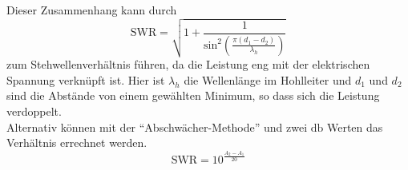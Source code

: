 Dieser Zusammenhang kann durch 
\begin{equation}
    \label{eqn:SWR}
    \text{SWR} =\sqrt{1 + \frac{1}{ \text{sin}^2 \left( \frac{\pi (d_1 - d_2)}{\lambda_h}  \right)} } 
\end{equation}
zum Stehwellenverhältnis führen, da die Leistung eng mit der elektrischen Spannung verknüpft ist. 
Hier ist $\lambda_h$ die Wellenlänge im Hohlleiter und $d_1$ und $d_2$ sind die Abstände von einem gewählten Minimum, so dass sich die Leistung verdoppelt. \\
Alternativ können mit der \enquote{Abschwächer-Methode} und zwei $\si{\decibel}$ Werten das Verhältnis errechnet werden.
\begin{equation}
    \label{eqn:SWR2}
    \text{SWR} = 10^{\frac{A_2-A_1}{20}}
\end{equation}
